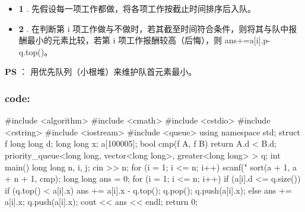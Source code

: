 \begin{itemize}
\item \textbf{1} . 先假设每一项工作都做，将各项工作按截止时间排序后入队。      
\item \textbf{2} . 在判断第 i 项工作做与不做时，若其截至时间符合条件，则将其与队中报酬最小的元素比较，若第 i 项工作报酬较高（后悔），则 ans+=a[i].p-q.top()。      
\end{itemize}

\textbf{PS} ： 用优先队列（小根堆）来维护队首元素最小。          

\subsubsection{code:}

\begin{cppcode}
#include <algorithm>
#include <cmath>
#include <cstdio>
#include <cstring>
#include <iostream>
#include <queue>
using namespace std;
struct f {
  long long d;
  long long x;
} a[100005];
bool cmp(f A, f B) { return A.d < B.d; }
priority_queue<long long, vector<long long>, greater<long long> > q;
int main() {
  long long n, i, j;
  cin >> n;
  for (i = 1; i <= n; i++) {
    scanf("%
  }
  sort(a + 1, a + n + 1, cmp);
  long long ans = 0;
  for (i = 1; i <= n; i++) {
    if (a[i].d <= q.size()) {
      if (q.top() < a[i].x) {
        ans += a[i].x - q.top();
        q.pop();
        q.push(a[i].x);
      }
    } else {
      ans += a[i].x;
      q.push(a[i].x);
    }
  }
  cout << ans << endl;
  return 0;
}
\end{cppcode}
